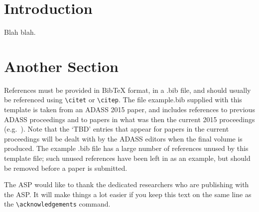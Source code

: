 \documentclass[11pt,twoside]{article}
\begin{document}
\section{Introduction}
Blah blah.

\section{Another Section}
References must be provided in BibTeX format, in a .bib file, and should usually be referenced using \verb"\citet" or \verb"\citep". The file example.bib supplied with this template is taken from an ADASS 2015 paper, and includes references to previous ADASS proceedings 
\citep[such as][]{1999ASPC..172..487P} and to papers in what was then the current 2015 proceedings (e.g.\ \citet{O11-4_adassxxv}). Note that the `TBD' entries that appear for papers in the current proceedings will be dealt with by the ADASS editors when the final volume is produced. The example .bib file has a large number of references unused by this template file; such unused references have been left in as an example, but should be removed before a paper is submitted.

\acknowledgements The ASP would like to thank the dedicated researchers who are publishing with the ASP.  It will make things a lot easier if you keep this text on the same line as the \verb"\acknowledgements" command.


\end{document}
